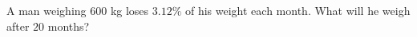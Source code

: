 A man weighing $600$ kg loses $3.12\%$ of his weight each month. What will he weigh after $20$ months?
